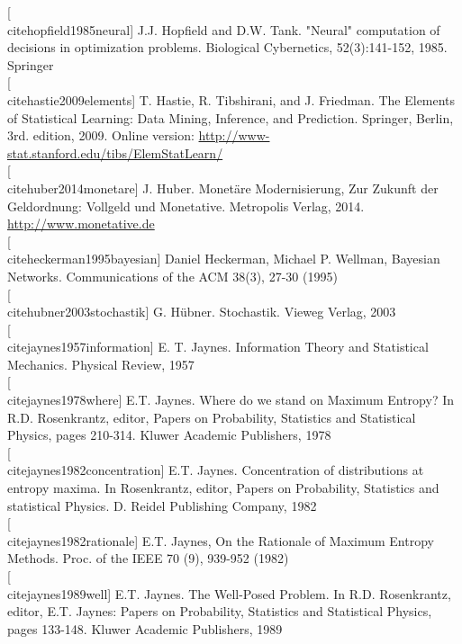 \documentclass[10pt]{book}
\begin{document}
[\\cite{hopfield1985neural}] J.J. Hopfield and D.W. Tank. "Neural" computation of decisions in optimization problems. Biological Cybernetics, 52(3):141-152, 1985. Springer\\[0pt]
[\\cite{hastie2009elements}] T. Hastie, R. Tibshirani, and J. Friedman. The Elements of Statistical Learning: Data Mining, Inference, and Prediction. Springer, Berlin, 3rd. edition, 2009. Online version: \href{http://www-stat.stanford.edu/tibs/ElemStatLearn/}{http://www-stat.stanford.edu/tibs/ElemStatLearn/}\\[0pt]
[\\cite{huber2014monetare}] J. Huber. Monetäre Modernisierung, Zur Zukunft der Geldordnung: Vollgeld und Monetative. Metropolis Verlag, 2014. \href{http://www.monetative.de}{http://www.monetative.de}\\[0pt]
[\\cite{heckerman1995bayesian}] Daniel Heckerman, Michael P. Wellman, Bayesian Networks. Communications of the ACM 38(3), 27-30 (1995)\\[0pt]
[\\cite{hubner2003stochastik}] G. Hübner. Stochastik. Vieweg Verlag, 2003\\[0pt]
[\\cite{jaynes1957information}] E. T. Jaynes. Information Theory and Statistical Mechanics. Physical Review, 1957\\[0pt]
[\\cite{jaynes1978where}] E.T. Jaynes. Where do we stand on Maximum Entropy? In R.D. Rosenkrantz, editor, Papers on Probability, Statistics and Statistical Physics, pages 210-314. Kluwer Academic Publishers, 1978\\[0pt]
[\\cite{jaynes1982concentration}] E.T. Jaynes. Concentration of distributions at entropy maxima. In Rosenkrantz, editor, Papers on Probability, Statistics and statistical Physics. D. Reidel Publishing Company, 1982\\[0pt]
[\\cite{jaynes1982rationale}] E.T. Jaynes, On the Rationale of Maximum Entropy Methods. Proc. of the IEEE 70 (9), 939-952 (1982)\\[0pt]
[\\cite{jaynes1989well}] E.T. Jaynes. The Well-Posed Problem. In R.D. Rosenkrantz, editor, E.T. Jaynes: Papers on Probability, Statistics and Statistical Physics, pages 133-148. Kluwer Academic Publishers, 1989\\[0pt]
\end{document}
